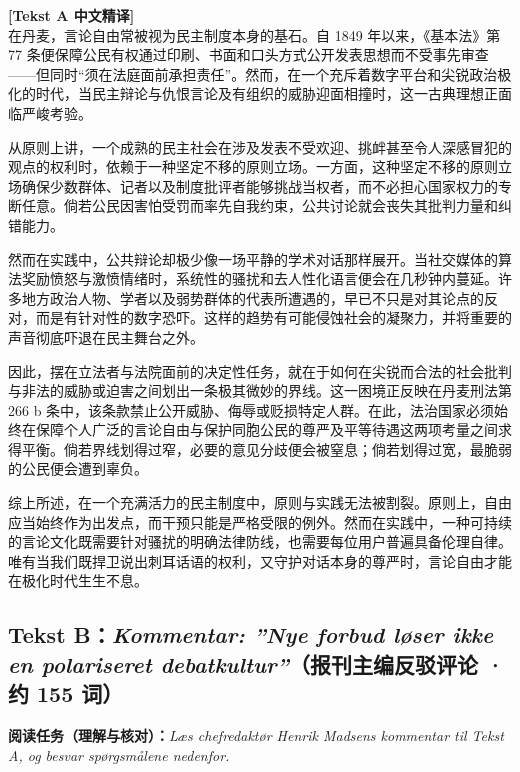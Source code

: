 \begin{transbox}
\small
\textbf{\color{NCDTeal}[Tekst A 中文精译]}\\
在丹麦，言论自由常被视为民主制度本身的基石。自 1849 年以来，《基本法》第 77 条便保障公民有权通过印刷、书面和口头方式公开发表思想而不受事先审查——但同时“须在法庭面前承担责任”。然而，在一个充斥着数字平台和尖锐政治极化的时代，当民主辩论与仇恨言论及有组织的威胁迎面相撞时，这一古典理想正面临严峻考验。

从原则上讲，一个成熟的民主社会在涉及发表不受欢迎、挑衅甚至令人深感冒犯的观点的权利时，依赖于一种坚定不移的原则立场。一方面，这种坚定不移的原则立场确保少数群体、记者以及制度批评者能够挑战当权者，而不必担心国家权力的专断任意。倘若公民因害怕受罚而率先自我约束，公共讨论就会丧失其批判力量和纠错能力。

然而在实践中，公共辩论却极少像一场平静的学术对话那样展开。当社交媒体的算法奖励愤怒与激愤情绪时，系统性的骚扰和去人性化语言便会在几秒钟内蔓延。许多地方政治人物、学者以及弱势群体的代表所遭遇的，早已不只是对其论点的反对，而是有针对性的数字恐吓。这样的趋势有可能侵蚀社会的凝聚力，并将重要的声音彻底吓退在民主舞台之外。

因此，摆在立法者与法院面前的决定性任务，就在于如何在尖锐而合法的社会批判与非法的威胁或迫害之间划出一条极其微妙的界线。这一困境正反映在丹麦刑法第 266 b 条中，该条款禁止公开威胁、侮辱或贬损特定人群。在此，法治国家必须始终在保障个人广泛的言论自由与保护同胞公民的尊严及平等待遇这两项考量之间求得平衡。倘若界线划得过窄，必要的意见分歧便会被窒息；倘若划得过宽，最脆弱的公民便会遭到辜负。

综上所述，在一个充满活力的民主制度中，原则与实践无法被割裂。原则上，自由应当始终作为出发点，而干预只能是严格受限的例外。然而在实践中，一种可持续的言论文化既需要针对骚扰的明确法律防线，也需要每位用户普遍具备伦理自律。唯有当我们既捍卫说出刺耳话语的权利，又守护对话本身的尊严时，言论自由才能在极化时代生生不息。
\end{transbox}

\subsection*{Tekst B：\textit{Kommentar: ”Nye forbud løser ikke en polariseret debatkultur”}（报刊主编反驳评论 · 约 155 词）}

\textbf{阅读任务（理解与核对）：}\textit{Læs chefredaktør Henrik Madsens kommentar til Tekst A, og besvar spørgsmålene nedenfor.}

